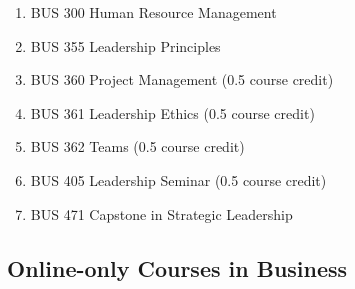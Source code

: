 \documentclass[
  letterpaper,
]{scrbook}
\providecommand{\tightlist}{%
  \setlength{\itemsep}{0pt}\setlength{\parskip}{0pt}}
\begin{document}
\begin{enumerate}
\def\labelenumi{\arabic{enumi}.}
\tightlist
\item
  BUS 300 Human Resource Management
\item
  BUS 355 Leadership Principles
\item
  BUS 360 Project Management (0.5 course credit)
\item
  BUS 361 Leadership Ethics (0.5 course credit)
\item
  BUS 362 Teams (0.5 course credit)
\item
  BUS 405 Leadership Seminar (0.5 course credit)
\item
  BUS 471 Capstone in Strategic Leadership
\end{enumerate}

\subsection{Online-only Courses in
Business}\label{online-only-courses-in-business}
\end{document}
